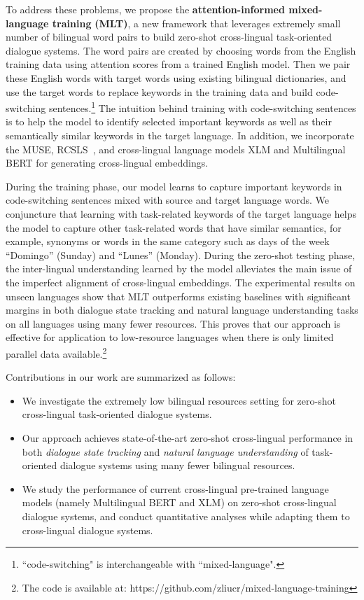 \documentclass[letterpaper]{article} %
\begin{document}
To address these problems, we propose the \textbf{attention-informed mixed-language training} \textbf{(MLT)}, a new framework that leverages extremely small number of bilingual word pairs to build zero-shot cross-lingual task-oriented dialogue systems. The word pairs are created by choosing words from the English training data using attention scores from a trained English model. Then we pair these English words with target words using existing bilingual dictionaries, and use the target words to replace keywords in the training data and build code-switching sentences.\footnote{``code-switching" is interchangeable with ``mixed-language".} The intuition behind training with code-switching sentences is to help the model to identify selected important keywords as well as their semantically similar keywords in the target language. In addition, we incorporate the MUSE, RCSLS~\cite{joulin2018loss}, and cross-lingual language models XLM and Multilingual BERT for generating cross-lingual embeddings.

During the training phase, our model learns to capture important keywords in code-switching sentences mixed with source and target language words. We conjuncture that learning with task-related keywords of the target language helps the model to capture other task-related words that have similar semantics, for example, synonyms or words in the same category such as days of the week ``Domingo'' (Sunday) and ``Lunes'' (Monday). During the zero-shot testing phase, the inter-lingual understanding learned by the model alleviates the main issue of the imperfect alignment of cross-lingual embeddings. The experimental results on unseen languages show that MLT outperforms existing baselines with significant margins in both dialogue state tracking and natural language understanding tasks on all languages using many fewer resources. This proves that our approach is effective for application to low-resource languages when there is only limited parallel data available.\footnote{The code is available at: https://github.com/zliucr/mixed-language-training}

Contributions in our work are summarized as follows:
\begin{itemize}
    \item We investigate the extremely low bilingual resources setting for zero-shot cross-lingual task-oriented dialogue systems.
    \item Our approach achieves state-of-the-art zero-shot cross-lingual performance in both \textit{dialogue state tracking} and \textit{natural language understanding} of task-oriented dialogue systems using many fewer bilingual resources.
    \item We study the performance of current cross-lingual pre-trained language models (namely Multilingual BERT and XLM) on zero-shot cross-lingual dialogue systems, and conduct quantitative analyses while adapting them to cross-lingual dialogue systems.
\end{itemize}
\end{document}
